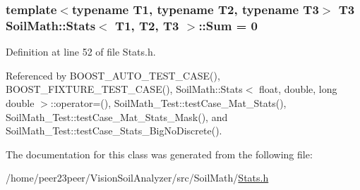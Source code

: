 \hypertarget{class_soil_math_1_1_stats_af326fa61048522fc146b799759e345f9}{}
\subsubsection[{Sum}]{\setlength{\rightskip}{0pt plus 5cm}template$<$typename T1, typename T2, typename T3$>$ T3 {\bf Soil\+Math\+::\+Stats}$<$ T1, T2, T3 $>$\+::Sum = 0}\label{class_soil_math_1_1_stats_af326fa61048522fc146b799759e345f9}


Definition at line 52 of file Stats.\+h.



Referenced by B\+O\+O\+S\+T\+\_\+\+A\+U\+T\+O\+\_\+\+T\+E\+S\+T\+\_\+\+C\+A\+S\+E(), B\+O\+O\+S\+T\+\_\+\+F\+I\+X\+T\+U\+R\+E\+\_\+\+T\+E\+S\+T\+\_\+\+C\+A\+S\+E(), Soil\+Math\+::\+Stats$<$ float, double, long double $>$\+::operator=(), Soil\+Math\+\_\+\+Test\+::test\+Case\+\_\+\+Mat\+\_\+\+Stats(), Soil\+Math\+\_\+\+Test\+::test\+Case\+\_\+\+Mat\+\_\+\+Stats\+\_\+\+Mask(), and Soil\+Math\+\_\+\+Test\+::test\+Case\+\_\+\+Stats\+\_\+\+Big\+No\+Discrete().



The documentation for this class was generated from the following file\+:\begin{DoxyCompactItemize}
\item 
/home/peer23peer/\+Vision\+Soil\+Analyzer/src/\+Soil\+Math/\hyperlink{_stats_8h}{Stats.\+h}\end{DoxyCompactItemize}
